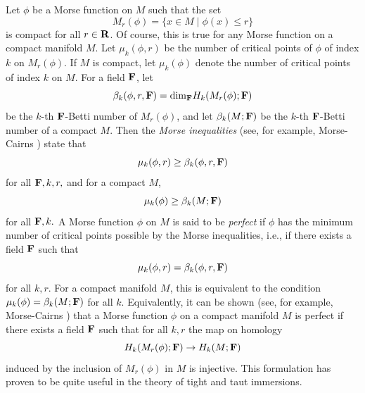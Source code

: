 \documentclass[12pt]{article}
\begin{document}
Let $\phi$ be a Morse function on $M$ such that the set
\begin{displaymath}
M_r(\phi) = \{x \in M \mid \phi(x) \leq r \}
\end{displaymath}
is compact for all $r \in {\bf R}$.  Of course, this is true
for any Morse function on a compact manifold $M$.  Let
$\mu_k(\phi,r)$ be the number of critical points of $\phi$
of index $k$ on $M_r(\phi)$.  If $M$ is compact, let
$\mu_k(\phi)$ denote the number of critical points of index
$k$ on $M$.  For a field ${\bf F}$, let
\begin{displaymath}
\beta_k(\phi,r,{\bf F}) = {\rm dim}_{\bf F} H_k(M_r(\phi);{\bf F})
\end{displaymath}
be the $k$-th ${\bf F}$-Betti number of $M_r(\phi)$, and let
$\beta_k(M;{\bf F})$ be the $k$-th ${\bf F}$-Betti number of a compact $M$.
Then the {\em Morse inequalities} (see, for example, Morse-Cairns
\cite[p. 270]{MC}) state that
\begin{displaymath}
\mu_k(\phi,r) \geq \beta_k(\phi,r,{\bf F})
\end{displaymath}
for all ${\bf F}, k, r,$ and for a compact $M$,
\begin{displaymath}
\mu_k(\phi) \geq \beta_k(M;{\bf F})
\end{displaymath}
for all ${\bf F}, k.$  A Morse function $\phi$ on $M$ is said to be
{\em perfect} if $\phi$ has the minimum number of critical points
possible by the Morse inequalities, i.e., if there exists a field ${\bf F}$
such that
\begin{equation}
\label{eq:perfect-fn}
\mu_k(\phi,r) = \beta_k(\phi,r,{\bf F})
\end{equation}
for all $k, r.$  For a compact manifold $M$, this is equivalent to 
the condition $\mu_k(\phi) = \beta_k(M;{\bf F})$ for all $k$.  Equivalently,
it can be shown (see, for example, Morse-Cairns \cite[p. 260]{MC}) that a
Morse function $\phi$ on a compact manifold $M$ is perfect if there
exists a field ${\bf F}$ such that for all $k,r$ the map on homology
\begin{equation}
\label{eq:perfect-compact-M}
H_k(M_r(\phi);{\bf F}) \rightarrow H_k(M;{\bf F})
\end{equation}
induced by the inclusion of $M_r(\phi)$ in $M$ is injective.
This formulation has proven to be quite useful in the theory of
tight and taut immersions.
\end{document}
